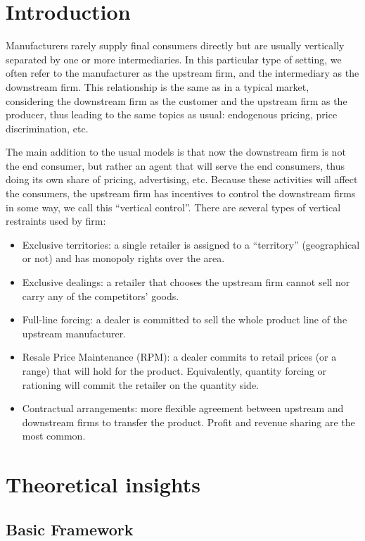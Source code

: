 \section{Introduction}

Manufacturers rarely supply final consumers directly but are usually vertically separated by one or more intermediaries. In this particular type of setting, we often refer to the manufacturer as the upstream firm, and the intermediary as the downstream firm. This relationship is the same as in a typical market, considering the downstream firm as the customer and the upstream firm as the producer, thus leading to the same topics as usual: endogenous pricing, price discrimination, etc.

The main addition to the usual models is that now the downstream firm is not the end consumer, but rather an agent that will serve the end consumers, thus doing its own share of pricing, advertising, etc. Because these activities will affect the consumers, the upstream firm has incentives to control the downstream firms in some way, we call this ``vertical control''. There are several types of vertical restraints used by firm:\begin{itemize}
\item Exclusive territories: a single retailer is assigned to a ``territory'' (geographical or not) and has monopoly rights over the area.
\item Exclusive dealings: a retailer that chooses the upstream firm cannot sell nor carry any of the competitors' goods.
\item Full-line forcing: a dealer is committed to sell the whole product line of the upstream manufacturer.
\item Resale Price Maintenance (RPM): a dealer commits to retail prices (or a range) that will hold for the product. Equivalently, quantity forcing or rationing will commit the retailer on the quantity side.
\item Contractual arrangements: more flexible agreement between upstream and downstream firms to transfer the product. Profit and revenue sharing are the most common.
\end{itemize}

\section{Theoretical insights}

\subsection{Basic Framework}

